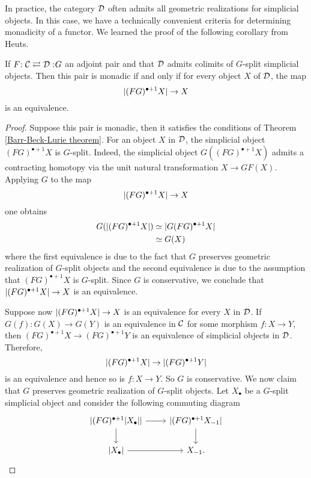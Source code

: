 In practice, the category ${\mathcal{D}}$ often admits all geometric realizations for simplicial objects. In this case, we have a technically convenient criteria for determining monadicity of a functor. We learned the proof of the following corollary from Heuts.
\begin{corollary}
\label{Cor of Barr-Beck-Lurie theorem}
If $F\negmedspace: {\mathcal{C}}\rightleftarrows {\mathcal{D}}:\negmedspace G$ an adjoint pair and that ${\mathcal{D}}$ admits colimits of $G$-split simplicial objects. Then this pair is monadic if and only if for every object $X$ of ${\mathcal{D}}$, the map
$$
\lvert(FG)^{\bullet+1}X\rvert \to X
$$
is an equivalence.
\end{corollary}
\begin{proof}
	Suppose this pair is monadic, then it satisfies the conditions of Theorem \ref{Barr-Beck-Lurie theorem}. 
	For an object $X$ in ${\mathcal{D}}$, the simplicial object $(FG)^{\bullet+1}X$ is $G$-split. Indeed, the simplicial object $G((FG)^{\bullet+1}X)$ admits a contracting homotopy via the unit natural transformation $X \to GF(X)$.
	Applying $G$ to the map 
	$$
	\lvert(FG)^{\bullet+1}X\rvert \to X
	$$
	one obtains
	\begin{align*}
		G(\lvert(FG)^{\bullet+1}X\rvert) & \simeq \lvert G(FG)^{\bullet+1}X\rvert\\
		& \simeq G(X)
	\end{align*}
	where the first equivalence is due to the fact that $G$ preserves geometric realization of $G$-split objects and the second equivalence is due to the assumption that $(FG)^{\bullet+1}X$ is $G$-split.  
	Since $G$ is conservative, we conclude that $\lvert(FG)^{\bullet+1}X\rvert \to X$ is an equivalence.
	
	Suppose now $\lvert(FG)^{\bullet+1}X\rvert \to X$ is an equivalence for every $X$ in ${\mathcal{D}}$. If $G(f): G(X) \to G(Y)$ is an equivalence in ${\mathcal{C}}$ for some morphism $f:X \to Y$, then $(FG)^{\bullet+1} X \to (FG)^{\bullet+1}Y$ is an equivalence of simplicial objects in ${\mathcal{D}}$. Therefore, 
	$$
	\lvert(FG)^{\bullet+1} X\rvert \to \lvert(FG)^{\bullet+1} Y\rvert
	$$
	is an equivalence and hence so is $f: X\to Y$. So $G$ is conservative.
	We now claim that $G$ preserves geometric realization of $G$-split objects.
	Let $X_{\bullet}$ be a $G$-split simplicial object and consider the following commuting diagram
	\[
	\begin{tikzcd}
		\abs{(FG)^{\bullet+1} \abs{X_{\bullet}}} \ar[r] \ar[d]& \abs{(FG)^{\bullet+1} X_{-1} \ar[d]}     \\
		\abs{X_{\bullet}} \ar[r] & X_{-1}  .
	\end{tikzcd}
	\]
	

\end{proof}
